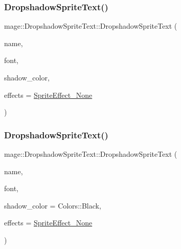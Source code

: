 \subsubsection{\texorpdfstring{Dropshadow\+Sprite\+Text()}{DropshadowSpriteText()}\hspace{0.1cm}{\footnotesize\ttfamily [1/4]}}
{\footnotesize\ttfamily mage\+::\+Dropshadow\+Sprite\+Text\+::\+Dropshadow\+Sprite\+Text (\begin{DoxyParamCaption}\item[{const string \&}]{name,  }\item[{\hyperlink{namespacemage_a1e01ae66713838a7a67d30e44c67703e}{Shared\+Ptr}$<$ \hyperlink{classmage_1_1_sprite_font}{Sprite\+Font} $>$}]{font,  }\item[{const \hyperlink{structmage_1_1_color}{Color} \&}]{shadow\+\_\+color,  }\item[{\hyperlink{namespacemage_a9cfe18123066ba4236f548f9de75d881}{Sprite\+Effect}}]{effects = {\ttfamily \hyperlink{namespacemage_a9cfe18123066ba4236f548f9de75d881af3c275fbfacfe174da928b2f24dfa515}{Sprite\+Effect\+\_\+\+None}} }\end{DoxyParamCaption})\hspace{0.3cm}{\ttfamily [explicit]}}

\hypertarget{classmage_1_1_dropshadow_sprite_text_aad4f7653cdc925c12cfc3a4915552efb}{}\label{classmage_1_1_dropshadow_sprite_text_aad4f7653cdc925c12cfc3a4915552efb} 
\subsubsection{\texorpdfstring{Dropshadow\+Sprite\+Text()}{DropshadowSpriteText()}\hspace{0.1cm}{\footnotesize\ttfamily [2/4]}}
{\footnotesize\ttfamily mage\+::\+Dropshadow\+Sprite\+Text\+::\+Dropshadow\+Sprite\+Text (\begin{DoxyParamCaption}\item[{const string \&}]{name,  }\item[{\hyperlink{namespacemage_a1e01ae66713838a7a67d30e44c67703e}{Shared\+Ptr}$<$ \hyperlink{classmage_1_1_sprite_font}{Sprite\+Font} $>$}]{font,  }\item[{const X\+M\+V\+E\+C\+T\+OR \&}]{shadow\+\_\+color = {\ttfamily Colors\+:\+:Black},  }\item[{\hyperlink{namespacemage_a9cfe18123066ba4236f548f9de75d881}{Sprite\+Effect}}]{effects = {\ttfamily \hyperlink{namespacemage_a9cfe18123066ba4236f548f9de75d881af3c275fbfacfe174da928b2f24dfa515}{Sprite\+Effect\+\_\+\+None}} }\end{DoxyParamCaption})\hspace{0.3cm}{\ttfamily [explicit]}}

